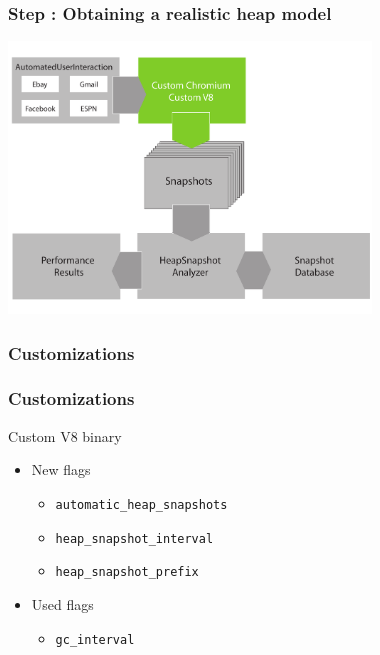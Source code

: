\begin{frame}
	\frametitle{Step \theStepCounter: Obtaining a realistic heap model}		
	\includegraphics[width=26em]{../imgs/solution_h_2.pdf}
\end{frame}

\subsubsection{Customizations}
\begin{frame}
	\frametitle{Customizations}
			
			Custom V8 binary
			\begin{itemize}
				\item New flags
				\begin{itemize}
					\item \texttt{automatic\_heap\_snapshots} 		%
					\item \texttt{heap\_snapshot\_interval} 		%
					\item \texttt{heap\_snapshot\_prefix} 			%
				\end{itemize}
				\item Used flags
				\begin{itemize}
					\item \texttt{gc\_interval} 					%
				\end{itemize}
			\end{itemize}
\end{frame}
	
